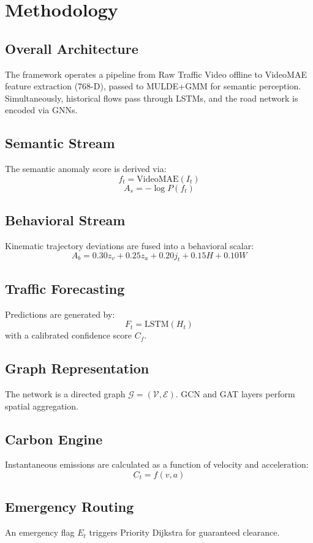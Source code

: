 \documentclass{ieeeaccess}
\begin{document}
\section{Methodology}
\label{sec:methodology}

\subsection{Overall Architecture}
The framework operates a pipeline from Raw Traffic Video offline to VideoMAE feature extraction (768-D), passed to MULDE+GMM for semantic perception. Simultaneously, historical flows pass through LSTMs, and the road network is encoded via GNNs.

\subsection{Semantic Stream}
The semantic anomaly score is derived via:
$$ f_t = \text{VideoMAE}(I_t) $$
$$ A_s = -\log P(f_t) $$

\subsection{Behavioral Stream}
Kinematic trajectory deviations are fused into a behavioral scalar:
$$ A_b = 0.30z_v + 0.25z_a + 0.20j_t + 0.15H + 0.10W $$

\subsection{Traffic Forecasting}
Predictions are generated by:
$$ F_t = \text{LSTM}(H_t) $$
with a calibrated confidence score $C_f$.

\subsection{Graph Representation}
The network is a directed graph $\mathcal{G} = (\mathcal{V}, \mathcal{E})$. GCN and GAT layers perform spatial aggregation.

\subsection{Carbon Engine}
Instantaneous emissions are calculated as a function of velocity and acceleration:
$$ C_t = f(v, a) $$

\subsection{Emergency Routing}
An emergency flag $E_t$ triggers Priority Dijkstra for guaranteed clearance.
\end{document}
